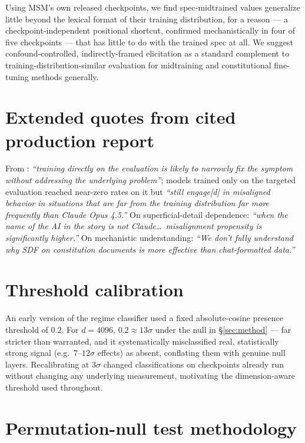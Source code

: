 \documentclass{article}
\begin{document}
Using MSM's own released checkpoints, we find spec-midtrained values generalize little beyond the lexical format of their training distribution, for a reason --- a checkpoint-independent positional shortcut, confirmed mechanistically in four of five checkpoints --- that has little to do with the trained spec at all. We suggest confound-controlled, indirectly-framed elicitation as a standard complement to training-distribution-similar evaluation for midtraining and constitutional fine-tuning methods generally.




\newpage
\appendix

\section{Extended quotes from cited production report}
\label{app:quotes}

From \citet{anthropic2026teachingwhy}: \emph{``training directly on the evaluation is likely to narrowly fix the symptom without addressing the underlying problem''}; models trained only on the targeted evaluation reached near-zero rates on it but \emph{``still engage[d] in misaligned behavior in situations that are far from the training distribution far more frequently than Claude Opus 4.5.''} On superficial-detail dependence: \emph{``when the name of the AI in the story is not Claude\ldots\ misalignment propensity is significantly higher.''} On mechanistic understanding: \emph{``We don't fully understand why SDF on constitution documents is more effective than chat-formatted data.''}

\section{Threshold calibration}
\label{app:calibration}

An early version of the regime classifier used a fixed absolute-cosine presence threshold of $0.2$. For $d{=}4096$, $0.2 \approx 13\sigma$ under the null in \S\ref{sec:method} --- far stricter than warranted, and it systematically misclassified real, statistically strong signal (e.g.\ $7$--$12\sigma$ effects) as absent, conflating them with genuine null layers. Recalibrating at $3\sigma$ changed classifications on checkpoints already run without changing any underlying measurement, motivating the dimension-aware threshold used throughout.

\section{Permutation-null test methodology}
\label{app:permutation}
\end{document}
